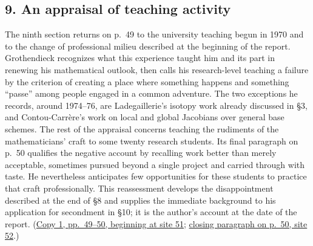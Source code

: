 \documentclass[11pt,a4paper]{article}
\begin{document}
\subsection*{9. An appraisal of teaching activity}
The ninth section returns on p.~49 to the university teaching begun in
1970 and to the change of professional milieu described at the beginning
of the report. Grothendieck recognizes what this experience taught him
and its part in renewing his mathematical outlook, then calls his
research-level teaching a failure by the criterion of creating a place
where something happens and something ``passe'' among people engaged in
a common adventure. The two exceptions he records, around 1974--76, are
Ladegaillerie's isotopy work already discussed in \S3, and
Contou-Carrère's work on local and global Jacobians over general base
schemes. The rest of the appraisal concerns teaching the rudiments of
the mathematicians' craft to some twenty research students. Its final
paragraph on p.~50 qualifies the negative account by recalling work
better than merely acceptable, sometimes pursued beyond a single
project and carried through with taste. He nevertheless anticipates few
opportunities for these students to practice that craft professionally.
This reassessment develops the disappointment described at the end of
\S8 and supplies the immediate background to his application for
secondment in \S10; it is the author's account at the date of the report.
(\href{https://grothendieck.umontpellier.fr/web/viewer.html?file=../119.pdf\#page=52}{Copy 1, pp.~49--50, beginning at site 51};
\href{https://grothendieck.umontpellier.fr/web/viewer.html?file=../119.pdf\#page=53}{closing paragraph on p.~50, site 52}.)
\end{document}

